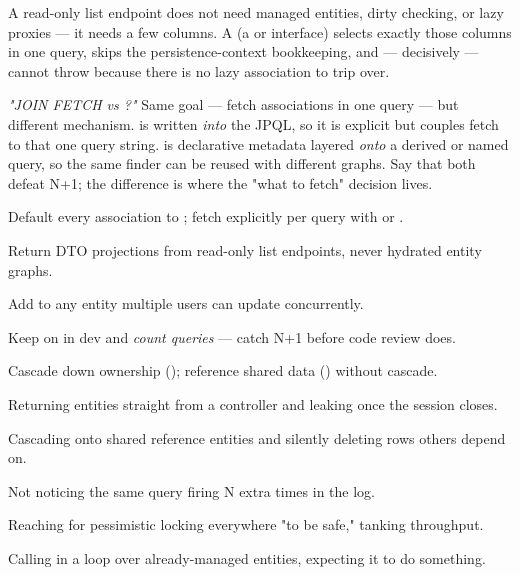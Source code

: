  A read-only list endpoint does not need managed entities, dirty checking, or lazy proxies --- it needs a few columns. A  (a  or interface) selects exactly those columns in one query, skips the persistence-context bookkeeping, and --- decisively --- cannot throw  because there is no lazy association to trip over.

\begin{interview}
\emph{"JOIN FETCH vs ?"} Same goal --- fetch associations in one query --- but different mechanism.  is written \emph{into} the JPQL, so it is explicit but couples fetch to that one query string.  is declarative metadata layered \emph{onto} a derived or named query, so the same finder can be reused with different graphs. Say that both defeat N+1; the difference is where the "what to fetch" decision lives.
\end{interview}

\begin{bestpractices}
\begin{wbitem}
  \item Default every association to ; fetch explicitly per query with  or .
  \item Return DTO projections from read-only list endpoints, never hydrated entity graphs.
  \item Add  to any entity multiple users can update concurrently.
  \item Keep  on in dev and \emph{count queries} --- catch N+1 before code review does.
  \item Cascade down ownership (); reference shared data () without cascade.
\end{wbitem}
\end{bestpractices}
\begin{mistakes}
\begin{wbitem}
  \item Returning entities straight from a controller and leaking  once the session closes.
  \item Cascading  onto shared reference entities and silently deleting rows others depend on.
  \item Not noticing the same query firing N extra times in the log.
  \item Reaching for pessimistic locking everywhere "to be safe," tanking throughput.
  \item Calling  in a loop over already-managed entities, expecting it to do something.
\end{wbitem}
\end{mistakes}


